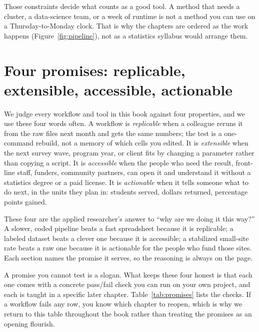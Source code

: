 \documentclass[
    a4paper,
    fontsize=10pt,
    twoside=true,
    numbers=noenddot,
]{kaobook}
\begin{document}
Those constraints decide what counts as a good tool. A method that needs a cluster, a data-science team, or a week of runtime is not a method you can use on a Thursday-to-Monday clock. That is why the chapters are ordered as the work happens (Figure~\ref{fig:pipeline}), not as a statistics syllabus would arrange them.

\section{Four promises: replicable, extensible, accessible, actionable}\label{sec:promises}
We judge every workflow and tool in this book against four properties, and we use these four words often. A workflow is \emph{replicable} when a colleague reruns it from the raw files next month and gets the same numbers; the test is a one-command rebuild, not a memory of which cells you edited. It is \emph{extensible} when the next survey wave, program year, or client fits by changing a parameter rather than copying a script. It is \emph{accessible} when the people who need the result, front-line staff, funders, community partners, can open it and understand it without a statistics degree or a paid license. It is \emph{actionable} when it tells someone what to do next, in the units they plan in: students served, dollars returned, percentage points gained.

These four are the applied researcher's answer to \enquote{why are we doing it this way?} A slower, coded pipeline beats a fast spreadsheet because it is replicable; a labeled dataset beats a clever one because it is accessible; a stabilized small-site rate beats a raw one because it is actionable for the people who fund those sites. Each section names the promise it serves, so the reasoning is always on the page.

A promise you cannot test is a slogan. What keeps these four honest is that each one comes with a concrete pass\slash fail check you can run on your own project, and each is taught in a specific later chapter. Table~\ref{tab:promises} lists the checks. If a workflow fails any row, you know which chapter to reopen, which is why we return to this table throughout the book rather than treating the promises as an opening flourish.
\end{document}
